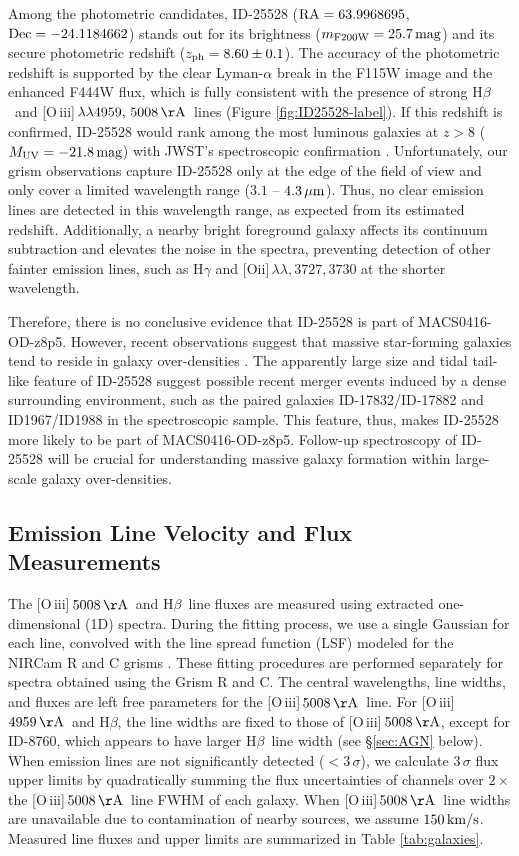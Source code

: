 \documentclass[twocolumn]{aastex631}
\def\Hb{H$\beta$}
\def\Oiiilong{[O\,{\sc iii}]\,$5008\,{\rm \AA}$}
\def\Oiiishort{[O\,{\sc iii}]\,$4959\,{\rm \AA}$}
\def\Oiiiboth{[O\,{\sc iii}]\,$\lambda\lambda4959,\,5008\,{\rm \AA}$}
\def\Hb{H$\beta$}
\begin{document}
Among the photometric candidates, ID-25528 (${\rm RA}=63.9968695$, ${\rm Dec}=-24.1184662$) stands out for its brightness (${ m}_{\rm F200W} = 25.7\,{\rm mag}$) and its secure photometric redshift ($z_{\rm ph}=8.60\pm0.1$).
The accuracy of the photometric redshift is supported by the clear Lyman-$\alpha$ break in the F115W image and the enhanced F444W flux, which is fully consistent with the presence of strong \Hb\ and \Oiiiboth\ lines (Figure \ref{fig:ID25528-label}).
If this redshift is confirmed, ID-25528 would rank among the most luminous galaxies at $z>8$ ($M_{\rm UV}=-21.8\,{\rm mag}$) with JWST's spectroscopic confirmation \citep[e.g.,][]{Roberts-Borsani2024,DEugenio2024}.
Unfortunately, our grism observations capture ID-25528 only at the edge of the field of view and only cover a limited wavelength range ($3.1$ -- $4.3\,{\rm \mu m}$).
Thus, no clear emission lines are detected in this wavelength range, as expected from its estimated redshift.
Additionally, a nearby bright foreground galaxy affects its continuum subtraction and elevates the noise in the spectra, preventing detection of other fainter emission lines, such as H$\gamma$ and [O{\sc ii}]$\,\lambda\lambda,3727,3730$ at the shorter wavelength.

Therefore, there is no conclusive evidence that ID-25528 is part of MACS0416-OD-z8p5. However, recent observations suggest that massive star-forming galaxies tend to reside in galaxy over-densities \citep[e.g.,][]{Hashimoto2023, Ma2024}. The apparently large size and tidal tail-like feature of ID-25528 suggest possible recent merger events induced by a dense surrounding environment, such as the paired galaxies ID-17832/ID-17882 and ID1967/ID1988 in the spectroscopic sample.
This feature, thus, makes ID-25528 more likely to be part of MACS0416-OD-z8p5. Follow-up spectroscopy of ID-25528 will be crucial for understanding massive galaxy formation within large-scale galaxy over-densities.

\subsection{Emission Line Velocity and Flux Measurements}

The \Oiiilong\ and \Hb\ line fluxes are measured using extracted one-dimensional (1D) spectra.
During the fitting process, we use a single Gaussian for each line, convolved with the line spread function (LSF) modeled for the NIRCam R and C grisms \citep{Sun2023}. These fitting procedures are performed separately for spectra obtained using the Grism R and C.
The central wavelengths, line widths, and fluxes are left free parameters for the \Oiiilong\ line. For \Oiiishort\ and \Hb, the line widths are fixed to those of \Oiiilong, except for ID-8760, which appears to have larger \Hb\ line width (see \S\ref{sec:AGN} below).
When emission lines are not significantly detected ($<3\,\sigma$), we calculate $3\,\sigma$ flux upper limits by quadratically summing the flux uncertainties of channels over $2\times$ the \Oiiilong\ line FWHM of each galaxy. When \Oiiilong\ line widths are unavailable due to contamination of nearby sources, we assume $150\,{\rm km/s}$.
Measured line fluxes and upper limits are summarized in Table \ref{tab:galaxies}.
\end{document}
